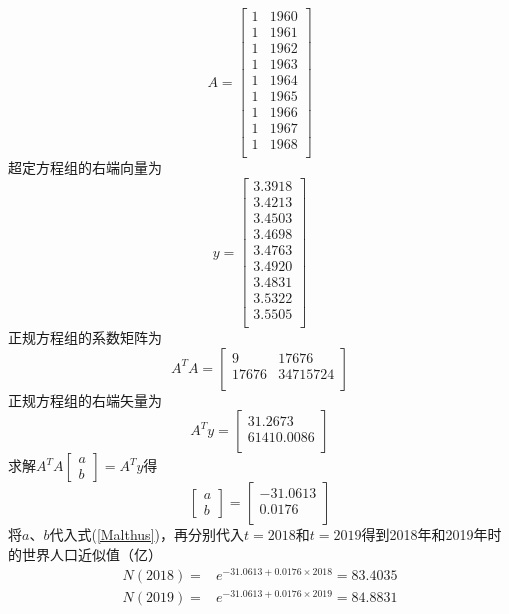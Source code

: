 \documentclass[10pt,a4paper]{article}
\begin{document}
\[
A=\left[\begin{array}{cc}
1 & 1960 \\
1 & 1961 \\
1 & 1962 \\
1 & 1963 \\
1 & 1964 \\
1 & 1965 \\
1 & 1966 \\
1 & 1967 \\
1 & 1968 \\
\end{array}\right]
\]
超定方程组的右端向量为
\[
y=\left[\begin{array}{c}
3.3918 \\
3.4213 \\
3.4503 \\
3.4698 \\
3.4763 \\
3.4920 \\
3.4831 \\
3.5322 \\
3.5505 \\
\end{array}\right]
\]
正规方程组的系数矩阵为
\[
A^TA=\left[\begin{array}{cc}
9 & 17676 \\
17676 & 34715724 \\
\end{array}\right]
\]
正规方程组的右端矢量为
\[
A^Ty=\left[\begin{array}{c}
31.2673 \\
61410.0086 \\
\end{array}\right]
\]
求解$A^TA\left[\begin{array}{l}a\\b\end{array}\right]=A^Ty$得
\[
\left[\begin{array}{l}a\\b\end{array}\right]=\left[\begin{array}{c}-31.0613 \\0.0176 \\\end{array}\right]
\]
将$a$、$b$代入式(\ref{Malthus})，再分别代入$t=2018$和$t=2019$得到2018年和2019年时的世界人口近似值（亿）
\begin{align*}
N(2018)=&e^{-31.0613+0.0176\times2018}=83.4035\\
N(2019)=&e^{-31.0613+0.0176\times2019}=84.8831
\end{align*}
\end{document}
